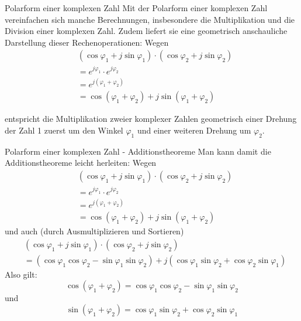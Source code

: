 \begin{frame}{Polarform einer komplexen Zahl}
Mit der Polarform einer komplexen Zahl vereinfachen sich manche Berechnungen, insbesondere die Multiplikation und die Division einer komplexen Zahl. Zudem liefert sie eine geometrisch anschauliche Darstellung dieser Rechenoperationen:
Wegen 
\begin{eqnarray*}	
& (\cos\varphi_1 + j \sin\varphi_1 )  \cdot (\cos\varphi_2 + j \sin\varphi_2 ) \\ &  = e^{j\varphi_1} \cdot e^{j\varphi_2} \\ & = e^{j(\varphi_1 + \varphi_2)} \\ & = \cos(\varphi_1 + \varphi_2 )+ j \sin (\varphi_1 + \varphi_2) 
\end{eqnarray*}

entspricht die Multiplikation zweier komplexer Zahlen geometrisch einer Drehung der Zahl 1 zuerst um den Winkel $\varphi_1$ und einer weiteren Drehung um $\varphi_2$.	
\end{frame}

\begin{frame}{Polarform einer komplexen Zahl - Additionstheoreme}
Man kann damit die Additionstheoreme leicht herleiten: Wegen 
\begin{eqnarray*}	
& (\cos\varphi_1 + j \sin\varphi_1 )  \cdot (\cos\varphi_2 + j \sin\varphi_2 ) \\ &  = e^{j\varphi_1} \cdot e^{j\varphi_2} \\ & = e^{j(\varphi_1 + \varphi_2)} \\ & = \cos(\varphi_1 + \varphi_2 )+ j \sin (\varphi_1 + \varphi_2) 
\end{eqnarray*}
und auch (durch Ausmultiplizieren und Sortieren)
\begin{eqnarray*}	
& (\cos\varphi_1 + j \sin\varphi_1 )  \cdot (\cos\varphi_2 + j \sin\varphi_2 ) \\ 
&  = (\cos \varphi_1 \cos \varphi_2 - \sin\varphi_1 \sin\varphi_2 ) + j (\cos \varphi_1 \sin\varphi_2 +  \cos \varphi_2 \sin\varphi_1 )
\end{eqnarray*}
Also gilt:
$$
\cos(\varphi_1 + \varphi_2 ) = \cos \varphi_1 \cos \varphi_2 - \sin\varphi_1 \sin\varphi_2 
$$
und 
$$
\sin (\varphi_1 + \varphi_2)  = \cos \varphi_1 \sin\varphi_2 +  \cos \varphi_2 \sin\varphi_1
$$

\end{frame} 